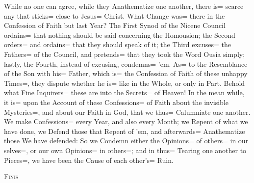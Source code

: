 While no one can agree, while they Anathematize one another, there is= scarce any that sticks= close to Jesus= Christ.
What Change was= there in the Confession of Faith but last Year?
The First Synod of the Nicene Council ordains= that nothing should be said concerning the Homousion;
the Second orders= and ordains= that they should speak of it;
the Third excuses= the Fathers= of the Council, and pretends= that they took the Word Ousia simply;
lastly, the Fourth, instead of excusing, condemns= 'em.
As= to the Resemblance of the Son with his= Father, which is= the Confession of Faith of these unhappy Times=, they dispute whether he is= like in the Whole, or only in Part.
Behold what Fine Inquirers= these are into the Secrets= of Heaven!
In the mean while, it is= upon the Account of these Confessions= of Faith about the invisible Mysteries=, and about our Faith in God, that we thus= Calumniate one another.
We make Confessions= every Year, and also every Month;
we Repent of what we have done, we Defend those that Repent of 'em, and afterwards= Anathematize those We have defended:
So we Condemn either the Opinions= of others= in our selves=, or our own Opinions= in others=;
and in thus= Tearing one another to Pieces=, we have been the Cause of each other's= Ruin.

\textsc{Finis}
